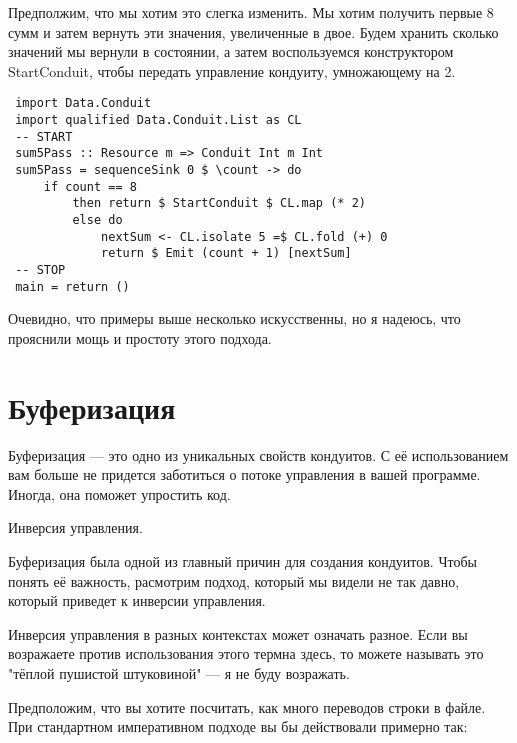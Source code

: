Предполжим, что мы хотим это слегка изменить. Мы хотим получить первые 8 сумм и затем вернуть эти значения, увеличенные в двое. Будем хранить сколько значений мы вернули в состоянии, а затем воспользуемся конструктором StartConduit, чтобы передать управление кондуиту, умножающему на 2.
\begin{lstlisting}
 import Data.Conduit
 import qualified Data.Conduit.List as CL
 -- START
 sum5Pass :: Resource m => Conduit Int m Int
 sum5Pass = sequenceSink 0 $ \count -> do
     if count == 8
         then return $ StartConduit $ CL.map (* 2)
         else do
             nextSum <- CL.isolate 5 =$ CL.fold (+) 0
             return $ Emit (count + 1) [nextSum]
 -- STOP
 main = return ()
\end{lstlisting}
Очевидно, что примеры выше несколько искусственны, но я надеюсь, что прояснили мощь и простоту этого подхода. 
 
\section{Буферизация}

Буферизация --- это одно из уникальных свойств кондуитов. С её использованием вам больше не придется заботиться о потоке управления в вашей программе.
Иногда, она поможет упростить код.


Инверсия управления.

Буферизация была одной из главный причин для создания кондуитов. Чтобы понять её важность, расмотрим подход, который мы видели не так давно, который приведет к инверсии управления.

Инверсия управления в разных контекстах может означать разное. Если вы возражаете против использования этого термна здесь, то можете называть это "тёплой пушистой штуковиной" --- я не буду возражать.

Предположим, что вы хотите посчитать, как много переводов строки в файле. При стандартном императивном подходе вы бы действовали примерно так:

